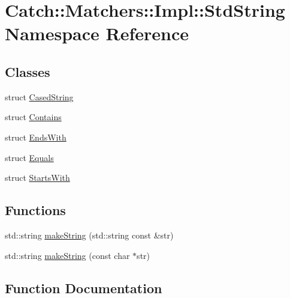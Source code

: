 \hypertarget{namespace_catch_1_1_matchers_1_1_impl_1_1_std_string}{}\section{Catch\+:\+:Matchers\+:\+:Impl\+:\+:Std\+String Namespace Reference}
\label{namespace_catch_1_1_matchers_1_1_impl_1_1_std_string}
\subsection*{Classes}
\begin{DoxyCompactItemize}
\item 
struct \hyperlink{struct_catch_1_1_matchers_1_1_impl_1_1_std_string_1_1_cased_string}{Cased\+String}
\item 
struct \hyperlink{struct_catch_1_1_matchers_1_1_impl_1_1_std_string_1_1_contains}{Contains}
\item 
struct \hyperlink{struct_catch_1_1_matchers_1_1_impl_1_1_std_string_1_1_ends_with}{Ends\+With}
\item 
struct \hyperlink{struct_catch_1_1_matchers_1_1_impl_1_1_std_string_1_1_equals}{Equals}
\item 
struct \hyperlink{struct_catch_1_1_matchers_1_1_impl_1_1_std_string_1_1_starts_with}{Starts\+With}
\end{DoxyCompactItemize}
\subsection*{Functions}
\begin{DoxyCompactItemize}
\item 
std\+::string \hyperlink{namespace_catch_1_1_matchers_1_1_impl_1_1_std_string_a1c41960bd2b455975e7be3cb87878fef}{make\+String} (std\+::string const \&str)
\item 
std\+::string \hyperlink{namespace_catch_1_1_matchers_1_1_impl_1_1_std_string_a42a104fb88baf158ed3b7d0d422afdaa}{make\+String} (const char $\ast$str)
\end{DoxyCompactItemize}


\subsection{Function Documentation}
\hypertarget{namespace_catch_1_1_matchers_1_1_impl_1_1_std_string_a1c41960bd2b455975e7be3cb87878fef}{}\label{namespace_catch_1_1_matchers_1_1_impl_1_1_std_string_a1c41960bd2b455975e7be3cb87878fef} 
